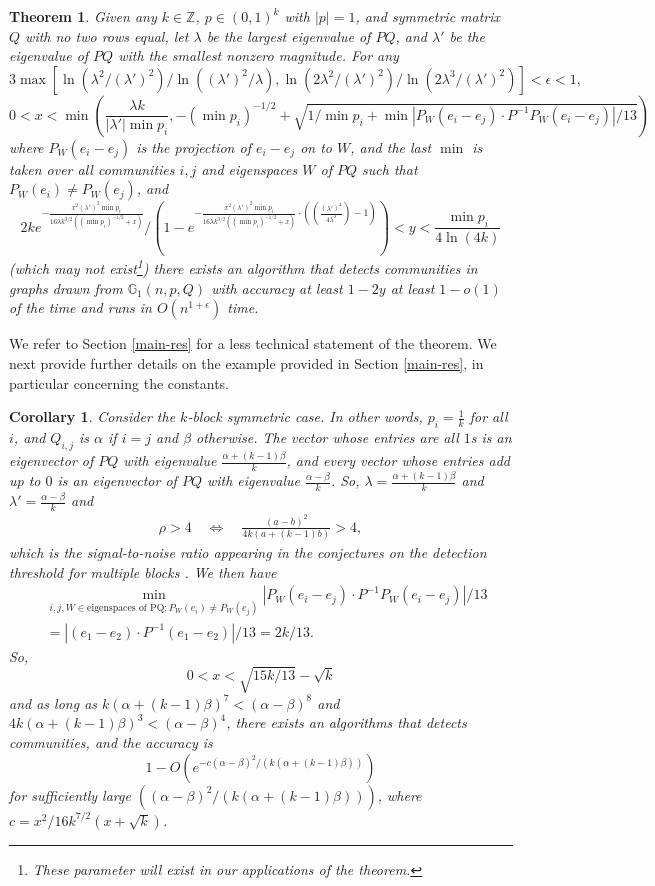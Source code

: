 \documentclass[11pt]{article}
\newcommand{\gss}{\mathbb{G}_1}
\newcommand{\1}{\mathbb{1}}
\newtheorem{theorem}{Theorem}
\newtheorem{corollary}{Corollary}
\begin{document}
\begin{theorem}\label{thm1}
Given any $k\in \mathbb{Z}$, $p\in (0,1)^k$ with $|p|=1$, and symmetric matrix $Q$ with no two rows equal, let $\lambda$ be the largest eigenvalue of $PQ$, and $\lambda'$ be the eigenvalue of $PQ$ with the smallest nonzero magnitude. For any \[3\max[\ln(\lambda^2/(\lambda')^2)/\ln((\lambda')^2/\lambda),\ln(2\lambda^2/(\lambda')^2)/\ln(2\lambda^3/(\lambda')^2)]<\epsilon<1,\]
\[ 0<x<\min\left(\frac{\lambda k}{|\lambda'|\min p_i},-(\min p_i)^{-1/2}+\sqrt{1/\min p_i+\min|P_W(e_i-e_j)\cdot P^{-1}P_W(e_i-e_j)|/13}\right)\]
where $P_W(e_i-e_j)$ is the projection of $e_i-e_j$ on to $W$, and the last $\min$ is taken over all communities $i,j$ and eigenspaces $W$ of $PQ$ such that $P_W(e_i)\ne P_W(e_j)$, and
\[2ke^{-\frac{x^2(\lambda')^2\min p_i}{16\lambda k^{3/2}((\min p_i)^{-1/2}+x)}}/(1-e^{-\frac{x^2(\lambda')^2\min p_i}{16\lambda k^{3/2}((\min p_i)^{-1/2}+x)}\cdot((\frac{(\lambda')^4}{4\lambda^3})-1)})<y<\frac{\min p_i}{4\ln(4k)}\]
(which may not exist\footnote{These parameter will exist in our applications of the theorem.}) there exists an algorithm that detects communities in graphs drawn from $\gss(n,p,Q)$ with accuracy at least $1-2y$ at least $1-o(1)$ of the time and runs in $O(n^{1+\epsilon})$ time.
\end{theorem}

We refer to Section \ref{main-res} for a less technical statement of the theorem. We next provide further details on the example provided in Section \ref{main-res}, in particular concerning the constants.  
\begin{corollary}\label{full-coro}
Consider the $k$-block symmetric case. In other words, $p_i=\frac{1}{k}$ for all $i$, and $Q_{i,j}$ is $\alpha$ if $i=j$ and $\beta$ otherwise. The vector whose entries are all $1$s is an eigenvector of $PQ$ with eigenvalue $\frac{\alpha+(k-1)\beta}{k}$, and every vector whose entries add up to $0$ is an eigenvector of $PQ$ with eigenvalue $\frac{\alpha-\beta}{k}$. So, $\lambda=\frac{\alpha+(k-1)\beta}{k}$ and $\lambda'=\frac{\alpha-\beta}{k}$
and 
\begin{align}
\rho > 4 \quad \Leftrightarrow \quad \frac{(a-b)^2}{4k(a+(k-1)b)} >4,
\end{align}
which is the signal-to-noise ratio appearing in the conjectures on the detection threshold for multiple blocks \cite{decelle,mossel-sbm}. We then have 
\begin{align}
&\min_{i,j,W\in \text{eigenspaces of PQ};P_W(e_i)\ne P_W(e_j)}|P_W(e_i-e_j)\cdot P^{-1}P_W(e_i-e_j)|/13\\
&=|(e_1-e_2)\cdot P^{-1}(e_1-e_2)|/13=2k/13.
\end{align}
So, \[0<x<\sqrt{15k/13}-\sqrt{k}\] and as long as $k(\alpha+(k-1)\beta)^7<(\alpha-\beta)^8$ and $4k(\alpha+(k-1)\beta)^3<(\alpha-\beta)^4$, there exists an algorithms that detects communities, and the accuracy is $$1-O(e^{-c(\alpha-\beta)^2/(k(\alpha+(k-1)\beta))})$$ for sufficiently large $((\alpha-\beta)^2/(k(\alpha+(k-1)\beta)))$, where $c=x^2/16k^{7/2}(x+\sqrt{k})$. 
\end{corollary}
\end{document}
